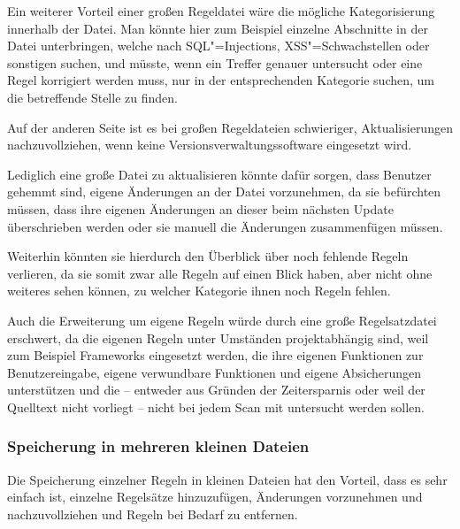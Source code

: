                 Ein weiterer Vorteil einer großen Regeldatei wäre die mögliche Kategorisierung innerhalb der Datei.
                Man könnte hier zum Beispiel einzelne Abschnitte in der Datei unterbringen,
                welche nach
                \gls{SQL}"=Injections,
                \gls{XSS}"=Schwachstellen oder
                sonstigen suchen,
                und
                müsste,
                wenn ein Treffer genauer untersucht oder
                eine Regel korrigiert werden muss,
                nur in der entsprechenden Kategorie suchen,
                um die betreffende Stelle zu finden.

                Auf der anderen Seite ist es bei großen Regeldateien schwieriger,
                Aktualisierungen nachzuvollziehen,
                wenn keine Versionsverwaltungssoftware eingesetzt wird.

                Lediglich eine große Datei zu aktualisieren könnte dafür sorgen,
                dass Benutzer gehemmt sind,
                eigene Änderungen an der Datei vorzunehmen,
                da sie befürchten müssen,
                dass ihre eigenen Änderungen an dieser beim nächsten Update überschrieben werden oder
                sie manuell die Änderungen zusammenfügen müssen.

                Weiterhin könnten sie hierdurch den Überblick über noch fehlende Regeln verlieren,
                da sie somit zwar alle Regeln auf einen Blick haben,
                aber nicht ohne weiteres sehen können,
                zu welcher Kategorie ihnen noch Regeln fehlen.

                Auch die Erweiterung um eigene Regeln würde durch eine große Regelsatzdatei erschwert,
                da die eigenen Regeln unter Umständen projektabhängig sind,
                weil zum Beispiel Frameworks eingesetzt werden,
                die ihre eigenen Funktionen zur Benutzereingabe,
                eigene verwundbare Funktionen und
                eigene Absicherungen unterstützen und
                die
                -- entweder aus Gründen der Zeitersparnis oder
                weil der Quelltext nicht vorliegt
                -- nicht bei jedem Scan mit untersucht werden sollen.

            \subsubsection{Speicherung in mehreren kleinen Dateien}
                Die Speicherung einzelner Regeln in kleinen Dateien hat den Vorteil,
                dass es sehr einfach ist,
                einzelne Regelsätze hinzuzufügen,
                Änderungen vorzunehmen und
                nachzuvollziehen und
                Regeln bei Bedarf zu entfernen.

